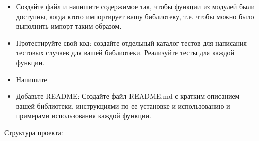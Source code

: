 \documentclass[letterpaper,10pt,russian]{sphinxmanual}
\begin{document}
\begin{enumerate}
\begin{itemize}
\begin{itemize}
\end{itemize}

\item {} 
\sphinxAtStartPar
Создайте файл  и напишите содержимое так, чтобы функции из модулей были доступны, когда кто\sphinxhyphen{}то импортирует вашу библиотеку, т.е. чтобы можно было выполнить импорт таким образом.

\begin{sphinxVerbatim}[commandchars=\\\{\}]
        
\end{sphinxVerbatim}

\item {} 
\sphinxAtStartPar
Протестируйте свой код: создайте отдельный каталог тестов для написания тестовых случаев для вашей библиотеки. Реализуйте тесты для каждой функции.

\item {} 
\sphinxAtStartPar
Напишите 

\item {} 
\sphinxAtStartPar
Добавьте README: Создайте файл README.md с кратким описанием вашей библиотеки, инструкциями по ее установке и использованию и примерами использования каждой функции.

\end{itemize}

\end{enumerate}

\sphinxAtStartPar
{}

\sphinxAtStartPar
Структура проекта:

\begin{sphinxVerbatim}[commandchars=\\\{\}]
     
        
        
        
     
        
        
     
     
\end{sphinxVerbatim}
\end{document}
